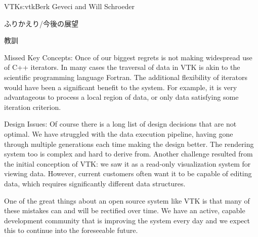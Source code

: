 \begin{aosachapter}{VTK}{s:vtk}{Berk Geveci and Will Schroeder}
\begin{aosasect1}{ふりかえり/今後の展望}
\begin{aosasect2}{教訓}
\begin{aosadescription}
  \item{Missed Key Concepts}: Once of our biggest regrets is not
  making widespread use of C++ iterators. In many cases the traversal
  of data in VTK is akin to the scientific programming language
  Fortran\@. The additional flexibility of iterators would have been a
  significant benefit to the system. For example, it is very
  advantageous to process a local region of data, or only data
  satisfying some iteration criterion.

  \item{Design Issues}: Of course there is a long list of design
  decisions that are not optimal. We have struggled with the data
  execution pipeline, having gone through multiple generations each
  time making the design better. The rendering system too is complex
  and hard to derive from. Another challenge resulted from the initial
  conception of VTK: we saw it as a read-only visualization system for
  viewing data. However, current customers often want it to be capable
  of editing data, which requires significantly different data
  structures.

\end{aosadescription}

One of the great things about an open source system like VTK is that
many of these mistakes can and will be rectified over time. We have an
active, capable development community that is improving the system
every day and we expect this to continue into the foreseeable future.

\end{aosasect2}

\end{aosasect1}

\end{aosachapter}

